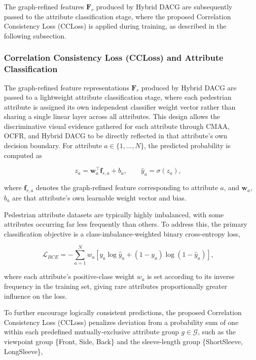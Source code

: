\documentclass{ieeeaccess}
\begin{document}
The graph-refined features $\mathbf{F}_r$ produced by Hybrid DACG are subsequently passed to the attribute classification stage, where the proposed Correlation Consistency Loss (CCLoss) is applied during training, as described in the following subsection.

\subsubsection{Correlation Consistency Loss (CCLoss) and Attribute Classification}

The graph-refined feature representations $\mathbf{F}_r$ produced by Hybrid DACG are passed to a lightweight attribute classification stage, where each pedestrian attribute is assigned its own independent classifier weight vector rather than sharing a single linear layer across all attributes. This design allows the discriminative visual evidence gathered for each attribute through CMAA, OCFR, and Hybrid DACG to be directly reflected in that attribute's own decision boundary. For attribute $a\in\{1,\dots,N\}$, the predicted probability is computed as

\begin{equation}
z_{a}=\mathbf{w}_{a}^{\top}\mathbf{f}_{r,a}+b_{a},\qquad \hat{y}_{a}=\sigma(z_{a}),
\label{eq:classifier}
\end{equation}

where $\mathbf{f}_{r,a}$ denotes the graph-refined feature corresponding to attribute $a$, and $\mathbf{w}_{a}$, $b_{a}$ are that attribute's own learnable weight vector and bias.

Pedestrian attribute datasets are typically highly imbalanced, with some attributes occurring far less frequently than others. To address this, the primary classification objective is a class-imbalance-weighted binary cross-entropy loss,

\begin{equation}
\mathcal{L}_{BCE}=-\sum_{a=1}^{N}w_{a}\left[y_{a}\log\hat{y}_{a}+(1-y_{a})\log(1-\hat{y}_{a})\right],
\label{eq:bce}
\end{equation}

where each attribute's positive-class weight $w_{a}$ is set according to its inverse frequency in the training set, giving rare attributes proportionally greater influence on the loss.

To further encourage logically consistent predictions, the proposed Correlation Consistency Loss (CCLoss) penalizes deviation from a probability sum of one within each predefined mutually-exclusive attribute group $g\in\mathcal{G}$, such as the viewpoint group \{Front, Side, Back\} and the sleeve-length group \{ShortSleeve, LongSleeve\},
\end{document}
